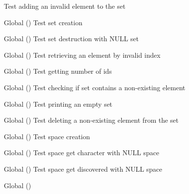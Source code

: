 \begin{DoxyRefList}
Test adding an invalid element to the set  
\item[Global \doxylink{set__test_8c_abed3d273788e23fc31ae7f5ed59277b9}{test2\+\_\+set\+\_\+create} ()]\label{test__test000139}%
%
Test set creation  
\item[Global \doxylink{set__test_8c_a8418524584e638fc6f2d03f726db61f1}{test2\+\_\+set\+\_\+destroy} ()]\label{test__test000141}%
%
Test set destruction with NULL set  
\item[Global \doxylink{set__test_8c_af868199a6847e38eab42e8363181f0ee}{test2\+\_\+set\+\_\+get\+\_\+id\+\_\+from\+\_\+index} ()]\label{test__test000151}%
%
Test retrieving an element by invalid index  
\item[Global \doxylink{set__test_8c_aaadf761f34e98a3a6d214cc2598ee852}{test2\+\_\+set\+\_\+get\+\_\+num\+\_\+ids} ()]\label{test__test000149}%
%
Test getting number of ids  
\item[Global \doxylink{set__test_8c_a27ba936110dfc23be0d0d3b9ebf07161}{test2\+\_\+set\+\_\+has\+\_\+id} ()]\label{test__test000147}%
%
Test checking if set contains a non-\/existing element  
\item[Global \doxylink{set__test_8c_a41ec3a4fd0af7d960f6b80561f9fec08}{test2\+\_\+set\+\_\+print} ()]\label{test__test000153}%
%
Test printing an empty set  
\item[Global \doxylink{set__test_8c_ae89af247bc1f5811ae037774e1920ff7}{test2\+\_\+set\+\_\+remove\+\_\+id} ()]\label{test__test000145}%
%
Test deleting a non-\/existing element from the set  
\item[Global \doxylink{space__test_8c_a012cd3cf37a8d91e2d7098a264c29d65}{test2\+\_\+space\+\_\+create} ()]\label{test__test000155}%
%
Test space creation  
\item[Global \doxylink{space__test_8c_a265ce3822740dbbd82b847437ff415ea}{test2\+\_\+space\+\_\+get\+\_\+character} ()]\label{test__test000183}%
%
Test space get character with NULL space  
\item[Global \doxylink{space__test_8c_a64ea5465e55d87db62b95d88d6ecfb69}{test2\+\_\+space\+\_\+get\+\_\+discovered} ()]\label{test__test000177}%
%
Test space get discovered with NULL space  
\item[Global \doxylink{space__test_8c_a3422f19fd8a821a06ccba2feb52034c2}{test2\+\_\+space\+\_\+get\+\_\+gdesc} ()]\label{test__test000175}%

\end{DoxyRefList}
